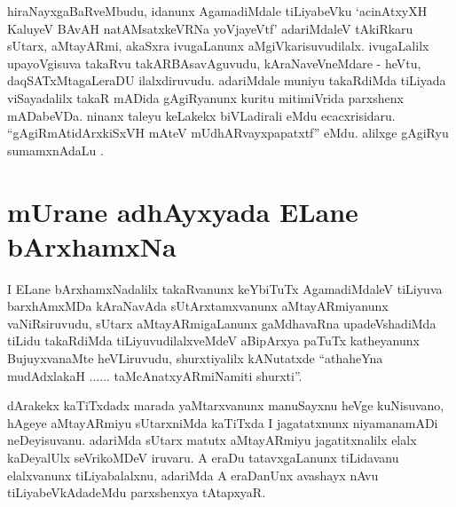 \begin{artha}
hiraNayxgaBaRveMbudu, idanunx AgamadiMdale tiLiyabeVku `acinAtxyXH KaluyeV BAvAH natAMsatxkeVRNa yoVjayeVtf' adariMdaleV tAkiRkaru sUtarx, aMtayARmi, akaSxra ivugaLanunx aMgiVkarisuvudilalx. ivugaLalilx upayoVgisuva takaRvu takARBAsavAguvudu, kAraNaveVneMdare - heVtu, daqSATxMtagaLeraDU ilalxdiruvudu. adariMdale muniyu takaRdiMda tiLiyada viSayadalilx takaR mADida gAgiRyanunx kuritu mitimiVrida parxshenx mADabeVDa. ninanx taleyu keLakekx biVLadirali eMdu ecacxrisidaru. ``gAgiRmAtidArxkiSxVH mAteV mUdhARvayxpapatxtf'' eMdu. alilxge gAgiRyu sumamxnAdaLu .
\end{artha}


\section*{mUrane adhAyxyada ELane bArxhamxNa}


\begin{artha}
I ELane bArxhamxNadalilx takaRvanunx keYbiTuTx AgamadiMdaleV tiLiyuva barxhAmxMDa kAraNavAda sUtArxtamxvanunx aMtayARmiyanunx vaNiRsiruvudu, sUtarx aMtayARmigaLanunx gaMdhavaRna upadeVshadiMda tiLidu takaRdiMda tiLiyuvudilalxveMdeV aBipArxya paTuTx katheyanunx BujuyxvanaMte heVLiruvudu, shurxtiyalilx kANutatxde \mdash  ``athaheYna mudAdxlakaH ...... taMcAnatxyARmiNamiti shurxti''.
\end{artha}


\begin{artha}
dArakekx kaTiTxdadx marada yaMtarxvanunx manuSayxnu heVge kuNisuvano, hAgeye aMtayARmiyu sUtarxniMda kaTiTxda I jagatatxnunx niyamanamADi neDeyisuvanu. adariMda sUtarx matutx aMtayARmiyu jagatitxnalilx elalx kaDeyalUlx seVrikoMDeV iruvaru. A eraDu tatavxgaLanunx tiLidavanu elalxvanunx tiLiyabalalxnu, adariMda A eraDanUnx avashayx nAvu tiLiyabeVkAdadeMdu parxshenxya tAtapxyaR.
\end{artha}


